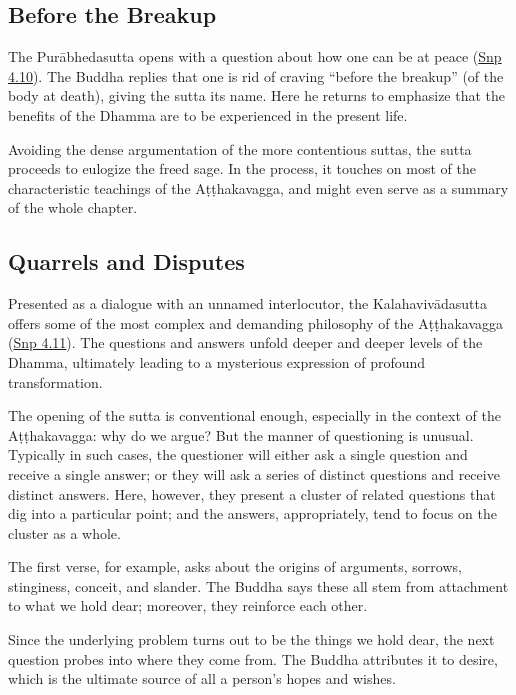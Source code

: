 \documentclass[12pt,openany]{book}%
\begin{document}
\subsection*{Before the Breakup}

The \textsanskrit{Purābhedasutta} opens with a question about how one can be at peace (\href{https://suttacentral.net/snp4.10/en/sujato}{Snp 4.10}). The Buddha replies that one is rid of craving “before the breakup” (of the body at death), giving the sutta its name. Here he returns to emphasize that the benefits of the Dhamma are to be experienced in the present life.

Avoiding the dense argumentation of the more contentious suttas, the sutta proceeds to eulogize the freed sage. In the process, it touches on most of the characteristic teachings of the \textsanskrit{Aṭṭhakavagga}, and might even serve as a summary of the whole chapter.

\subsection*{Quarrels and Disputes}

Presented as a dialogue with an unnamed interlocutor, the \textsanskrit{Kalahavivādasutta} offers some of the most complex and demanding philosophy of the \textsanskrit{Aṭṭhakavagga} (\href{https://suttacentral.net/snp4.11/en/sujato}{Snp 4.11}). The questions and answers unfold deeper and deeper levels of the Dhamma, ultimately leading to a mysterious expression of profound transformation.

The opening of the sutta is conventional enough, especially in the context of the \textsanskrit{Aṭṭhakavagga}: why do we argue? But the manner of questioning is unusual. Typically in such cases, the questioner will either ask a single question and receive a single answer; or they will ask a series of distinct questions and receive distinct answers. Here, however, they present a cluster of related questions that dig into a particular point; and the answers, appropriately, tend to focus on the cluster as a whole.

The first verse, for example, asks about the origins of arguments, sorrows, stinginess, conceit, and slander. The Buddha says these all stem from attachment to what we hold dear; moreover, they reinforce each other.

Since the underlying problem turns out to be the things we hold dear, the next question probes into where they come from. The Buddha attributes it to desire, which is the ultimate source of all a person’s hopes and wishes.
\end{document}
